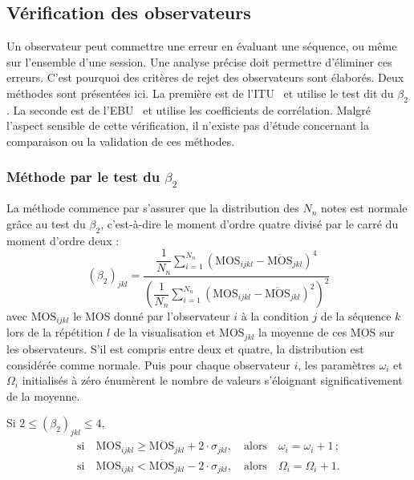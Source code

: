 \subsection{Vérification des observateurs}
Un observateur peut commettre une erreur en évaluant une séquence, ou même sur l'ensemble d'une session. Une analyse précise doit permettre d'éliminer ces erreurs. C'est pourquoi des critères de rejet des observateurs sont élaborés. Deux méthodes sont présentées ici. La première est de l'ITU~\cite{itu-bt500-11} et utilise le test dit du $\beta_2$. La seconde est de l'EBU~\cite{ebu-samviq} et utilise les coefficients de corrélation. Malgré l'aspect sensible de cette vérification, il n'existe pas d'étude concernant la comparaison ou la validation de ces méthodes.


\subsubsection{Méthode par le test du \texorpdfstring{$\beta_2$}{beta2}} \label{sssec:rejet-itu}
La méthode commence par s'assurer que la distribution des $N_n$ notes est normale grâce au test du $\beta_2$, c'est-à-dire le moment d'ordre quatre divisé par le carré du moment d'ordre deux :
\begin{equation}
\left(\beta_2\right)_{jkl} = \frac{\dfrac{1}{N_n} \sum\limits_{i=1}^{N_n} \left(\text{MOS}_{ijkl} - \overline{\text{MOS}}_{jkl}\right)^4}{\left(\dfrac{1}{N_n} \sum\limits_{i=1}^{N_n} \left(\text{MOS}_{ijkl} - \overline{\text{MOS}}_{jkl}\right)^2\right)^2}
\end{equation}
%
avec $\text{MOS}_{ijkl}$ le MOS donné par l'observateur $i$ à la condition $j$ de la séquence $k$ lors de la répétition $l$ de la visualisation et $\text{MOS}_{jkl}$ la moyenne de ces MOS sur les observateurs. S'il est compris entre deux et quatre, la distribution est considérée comme normale. Puis pour chaque observateur $i$, les paramètres $\omega_i$ et $\Omega_i$ initialisés à zéro énumèrent le nombre de valeurs s'éloignant significativement de la moyenne.

Si $2 \leqslant \left(\beta_2\right)_{jkl} \leqslant 4$,
\begin{equation*}\begin{array}{cc}
\text{si}\quad \text{MOS}_{ijkl} \geqslant \overline{\text{MOS}}_{jkl} + 2\cdot\sigma_{jkl},\quad \text{alors}\quad \omega_i = \omega_i + 1\, ; \\
\text{si}\quad \text{MOS}_{ijkl} < \overline{\text{MOS}}_{jkl} - 2\cdot\sigma_{jkl},\quad \text{alors}\quad \Omega_i = \Omega_i + 1.
\end{array}
\end{equation*}

